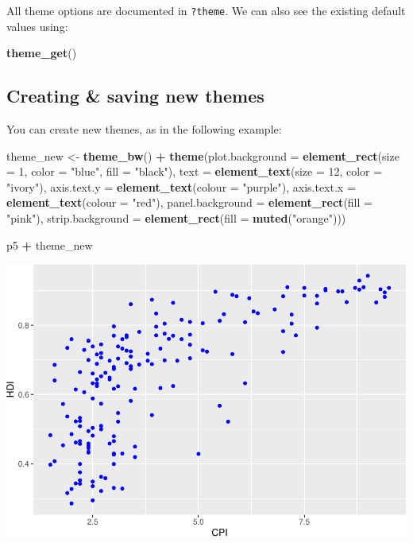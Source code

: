 \documentclass[]{book}
\newenvironment{Shaded}{\begin{snugshade}}{\end{snugshade}}
\newcommand{\DataTypeTok}[1]{\textcolor[rgb]{0.13,0.29,0.53}{#1}}
\newcommand{\DecValTok}[1]{\textcolor[rgb]{0.00,0.00,0.81}{#1}}
\newcommand{\KeywordTok}[1]{\textcolor[rgb]{0.13,0.29,0.53}{\textbf{#1}}}
\newcommand{\NormalTok}[1]{#1}
\newcommand{\OperatorTok}[1]{\textcolor[rgb]{0.81,0.36,0.00}{\textbf{#1}}}
\newcommand{\StringTok}[1]{\textcolor[rgb]{0.31,0.60,0.02}{#1}}
\begin{document}
All theme options are documented in \texttt{?theme}. We can also see the
existing default values using:

\begin{Shaded}
\begin{Highlighting}[]
\KeywordTok{theme_get}\NormalTok{()}
\end{Highlighting}
\end{Shaded}

\hypertarget{creating-saving-new-themes}{%
\subsection{Creating \& saving new themes}\label{creating-saving-new-themes}}

You can create new themes, as in the following example:

\begin{Shaded}
\begin{Highlighting}[]
\NormalTok{theme_new <-}\StringTok{ }\KeywordTok{theme_bw}\NormalTok{() }\OperatorTok{+}
\StringTok{  }\KeywordTok{theme}\NormalTok{(}\DataTypeTok{plot.background =} \KeywordTok{element_rect}\NormalTok{(}\DataTypeTok{size =} \DecValTok{1}\NormalTok{, }\DataTypeTok{color =} \StringTok{"blue"}\NormalTok{, }\DataTypeTok{fill =} \StringTok{"black"}\NormalTok{),}
        \DataTypeTok{text =} \KeywordTok{element_text}\NormalTok{(}\DataTypeTok{size =} \DecValTok{12}\NormalTok{, }\DataTypeTok{color =} \StringTok{"ivory"}\NormalTok{),}
        \DataTypeTok{axis.text.y =} \KeywordTok{element_text}\NormalTok{(}\DataTypeTok{colour =} \StringTok{"purple"}\NormalTok{),}
        \DataTypeTok{axis.text.x =} \KeywordTok{element_text}\NormalTok{(}\DataTypeTok{colour =} \StringTok{"red"}\NormalTok{),}
        \DataTypeTok{panel.background =} \KeywordTok{element_rect}\NormalTok{(}\DataTypeTok{fill =} \StringTok{"pink"}\NormalTok{),}
        \DataTypeTok{strip.background =} \KeywordTok{element_rect}\NormalTok{(}\DataTypeTok{fill =} \KeywordTok{muted}\NormalTok{(}\StringTok{"orange"}\NormalTok{)))}

\NormalTok{p5 }\OperatorTok{+}\StringTok{ }\NormalTok{theme_new}
\end{Highlighting}
\end{Shaded}

\includegraphics{R/Rgraphics/figures/unnamed-chunk-198-1.pdf}
\end{document}
